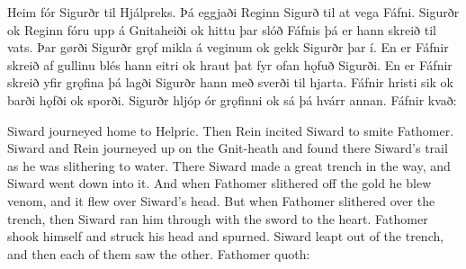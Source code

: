 \bpg\bpa Heim fór Sigurðr til Hjálpreks. Þá eggjaði Reginn Sigurð til at vega Fáfni. Sigurðr ok Reginn fóru upp á Gnitaheiði ok hittu þar slóð Fáfnis þá er hann skreið til vats. Þar gørði Sigurðr grǫf mikla á veginum ok gekk Sigurðr þar í. En er Fáfnir skreið af gullinu blés hann eitri ok hraut þat fyr ofan hǫfuð Sigurði. En er Fáfnir skreið yfir grǫfina þá lagði Sigurðr hann með sverði til hjarta. Fáfnir hristi sik ok barði hǫfði ok sporði. Sigurðr hljóp ór grǫfinni ok sá þá hvárr annan. Fáfnir kvað:\epa

\bpb Siward journeyed home to Helpric. Then Rein incited Siward to smite Fathomer. Siward and Rein journeyed up on the Gnit-heath and found there Siward’s trail as he was slithering to water. There Siward made a great trench in the way, and Siward went down into it. And when Fathomer slithered off the gold he blew venom, and it flew over Siward’s head. But when Fathomer slithered over the trench, then Siward ran him through with the sword to the heart. Fathomer shook himself and struck his head and spurned. Siward leapt out of the trench, and then each of them saw the other. Fathomer quoth:\epb\epg

